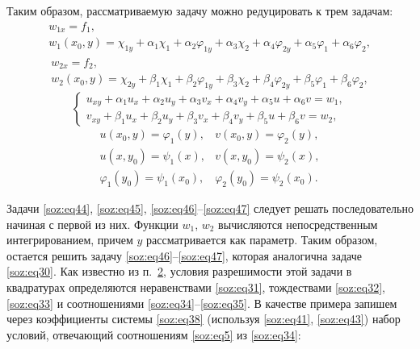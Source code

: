 Таким образом, рассматриваемую задачу можно редуцировать к трем задачам:
\begin{equation}
\begin{array}{l}
w_{1x}=f_{1},\\  
w_{1}(x_{0},y)=\chi_{1y}+\alpha_{1}\chi_{1}+\alpha_{2}\varphi_{1y}+\alpha_{3}\chi_{2}+\alpha_{4}\varphi_{2y}+\alpha_{5}\varphi_{1}+\alpha_{6}\varphi_{2},
\end{array}
\label{soz:eq44}
\end{equation}
\begin{equation}
\begin{array}{l}
w_{2x}=f_{2},\\  
w_{2}(x_{0},y)=\chi_{2y}+\beta_{1}\chi_{1}+\beta_{2}\varphi_{1y}+\beta_{3}\chi_{2}+\beta_{4}\varphi_{2y}+\beta_{5}\varphi_{1}+\beta_{6}\varphi_{2},
\end{array}
\label{soz:eq45}
\end{equation}
\begin{equation}
\left\{
\begin{array}{l}
u_{xy}+\alpha_{1}u_{x}+\alpha_{2}u_{y}+\alpha_{3}v_{x}+\alpha_{4}v_{y}+\alpha_{5}u+\alpha_{6}v=w_{1},\\
v_{xy}+\beta_{1}u_{x}+\beta_{2}u_{y}+\beta_{3}v_{x}+\beta_{4}v_{y}+\beta_{5}u+\beta_{6}v=w_{2},
\end{array}
\right.
\label{soz:eq46}
\end{equation}
\begin{equation}
\begin{array}{lr}
u(x_{0},y)=\varphi_{1}(y), & v(x_{0},y)=\varphi_{2}(y),\\
u(x,y_{0})=\psi_{1}(x), &  v(x,y_{0})=\psi_{2}(x),\\
\varphi_{1}(y_{0})=\psi_{1}(x_{0}), & \varphi_{2}(y_{0})=\psi_{2}(x_{0}).
\end{array}
\label{soz:eq47}
\end{equation}

Задачи \eqref{soz:eq44}, \eqref{soz:eq45}, \eqref{soz:eq46}--\eqref{soz:eq47} следует решать последовательно начиная с первой из них. 
Функции $w_{1}$, $w_{2}$ вычисляются непосредственным интегрированием, причем  $y$ рассматривается как параметр.  Таким образом, остается решить задачу \eqref{soz:eq46}--\eqref{soz:eq47}, которая аналогична задаче \eqref{soz:eq30}. 
Как известно из п.~\hyperlink{soz:p2}{2}, условия разрешимости этой задачи в квадратурах определяются неравенствами \eqref{soz:eq31},  тождествами \eqref{soz:eq32}, \eqref{soz:eq33} и  соотношениями \eqref{soz:eq34}--\eqref{soz:eq35}. 
В качестве примера запишем через коэффициенты системы \eqref{soz:eq38}  (используя \eqref{soz:eq41}, \eqref{soz:eq43}) набор условий, отвечающий соотношениям \eqref{soz:eq5}  из \eqref{soz:eq34}:

